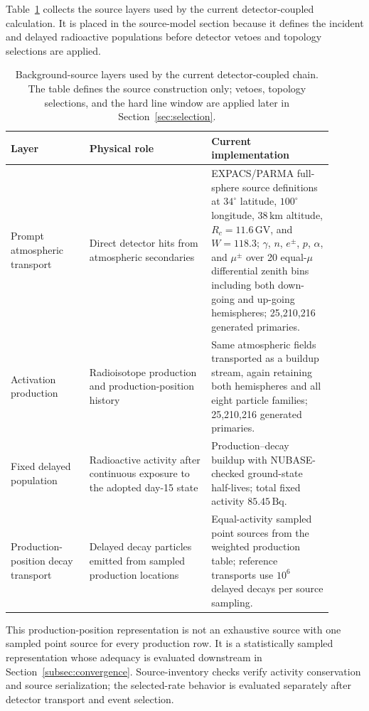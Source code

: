 \documentclass[preprint,12pt]{elsarticle}
\begin{document}
Table~\ref{tab:background_source_model} collects the source layers used by the current detector-coupled calculation. It is placed in the source-model section because it defines the incident and delayed radioactive populations before detector vetoes and topology selections are applied.

\begin{table}[t]
\centering
\caption{Background-source layers used by the current detector-coupled chain. The table defines the source construction only; vetoes, topology selections, and the hard line window are applied later in Section~\ref{sec:selection}.}
\label{tab:background_source_model}
\begin{tabular}{p{0.22\linewidth}p{0.34\linewidth}p{0.34\linewidth}}
\hline
Layer & Physical role & Current implementation \\
\hline
Prompt atmospheric transport & Direct detector hits from atmospheric secondaries & EXPACS/PARMA full-sphere source definitions at $34^\circ$ latitude, $100^\circ$ longitude, $38\,\mathrm{km}$ altitude, $R_c=11.6\,\mathrm{GV}$, and $W=118.3$; $\gamma$, $n$, $e^\pm$, $p$, $\alpha$, and $\mu^\pm$ over 20 equal-$\mu$ differential zenith bins including both down-going and up-going hemispheres; 25,210,216 generated primaries. \\
Activation production & Radioisotope production and production-position history & Same atmospheric fields transported as a buildup stream, again retaining both hemispheres and all eight particle families; 25,210,216 generated primaries. \\
Fixed delayed population & Radioactive activity after continuous exposure to the adopted day-15 state & Production--decay buildup with NUBASE-checked ground-state half-lives; total fixed activity $85.45\,\mathrm{Bq}$. \\
Production-position decay transport & Delayed decay particles emitted from sampled production locations & Equal-activity sampled point sources from the weighted production table; reference transports use $10^6$ delayed decays per source sampling. \\
\hline
\end{tabular}
\end{table}

This production-position representation is not an exhaustive source with one sampled point source for every production row. It is a statistically sampled representation whose adequacy is evaluated downstream in Section~\ref{subsec:convergence}. Source-inventory checks verify activity conservation and source serialization; the selected-rate behavior is evaluated separately after detector transport and event selection.
\end{document}
